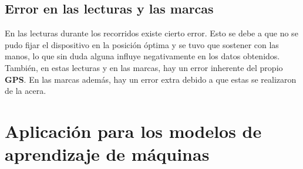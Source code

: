 	\subsection{Error en las lecturas y las marcas}
		En las lecturas durante los recorridos existe cierto error. Esto se debe a que no se pudo fijar el dispositivo en la posición óptima y se tuvo que
		sostener con las manos, lo que sin duda alguna influye negativamente en los datos obtenidos. También, en estas lecturas y en las marcas, hay un
		error inherente del propio \textbf{GPS}. En las marcas además, hay un error extra debido a que estas se realizaron de la acera.

\section{Aplicación para los modelos de aprendizaje de máquinas}
